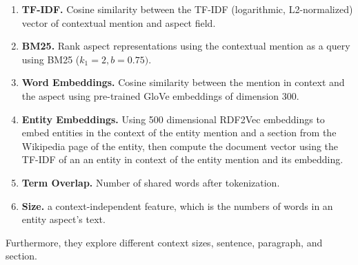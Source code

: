 \begin{enumerate}
    \item \textbf{TF-IDF.} Cosine similarity between the TF-IDF (logarithmic, L2-normalized) vector of contextual mention and aspect field.
    \item \textbf{BM25.} Rank aspect representations using the contextual mention as a query using BM25 ($k_1=2, b=0.75)$.
    \item \textbf{Word Embeddings.} Cosine similarity between the mention in context and
the aspect using pre-trained GloVe \cite{pennington2014glove} embeddings of dimension 300. 
    \item \textbf{Entity Embeddings.} Using 500 dimensional RDF2Vec \cite{ristoski2016rdf2vec} embeddings to embed entities in the context of the entity mention and a section from the Wikipedia page of the entity, then compute the document vector using the TF-IDF of an an entity in context of the entity mention and its embedding.
    \item \textbf{Term Overlap.} Number of shared words after tokenization.
    \item \textbf{Size.} a context-independent feature, which is the numbers of words in an entity aspect's text.
\end{enumerate}

Furthermore, they explore different context sizes, sentence, paragraph, and section.











